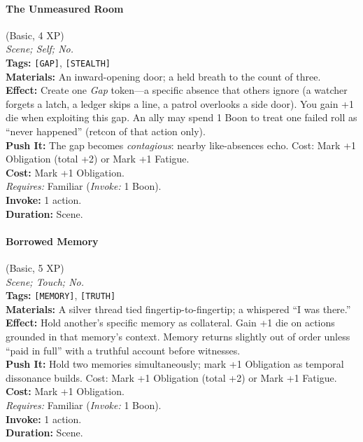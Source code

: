 \paragraph{The Unmeasured Room} (Basic, 4 XP) \hfill \\
\emph{Scene; Self; No.} \\
\textbf{Tags:} \texttt{[GAP]}, \texttt{[STEALTH]} \\
\textbf{Materials:} An inward-opening door; a held breath to the count of three. \\
\textbf{Effect:} Create one \emph{Gap} token---a specific absence that others ignore (a watcher forgets a latch, a ledger skips a line, a patrol overlooks a side door). You gain +1 die when exploiting this gap. An ally may spend 1 Boon to treat one failed roll as ``never happened'' (retcon of that action only). \\
\textbf{Push It:} The gap becomes \emph{contagious}: nearby like-absences echo. Cost: Mark +1 Obligation (total +2) or Mark +1 Fatigue. \\
\textbf{Cost:} Mark +1 Obligation. \\
\textit{Requires:} Familiar (\textit{Invoke:} 1 Boon). \\
\textbf{Invoke:} 1 action. \\
\textbf{Duration:} Scene.

\paragraph{Borrowed Memory} (Basic, 5 XP) \hfill \\
\emph{Scene; Touch; No.} \\
\textbf{Tags:} \texttt{[MEMORY]}, \texttt{[TRUTH]} \\
\textbf{Materials:} A silver thread tied fingertip-to-fingertip; a whispered ``I was there.'' \\
\textbf{Effect:} Hold another's specific memory as collateral. Gain +1 die on actions grounded in that memory's context. Memory returns slightly out of order unless ``paid in full'' with a truthful account before witnesses. \\
\textbf{Push It:} Hold two memories simultaneously; mark +1 Obligation as temporal dissonance builds. Cost: Mark +1 Obligation (total +2) or Mark +1 Fatigue. \\
\textbf{Cost:} Mark +1 Obligation. \\
\textit{Requires:} Familiar (\textit{Invoke:} 1 Boon). \\
\textbf{Invoke:} 1 action. \\
\textbf{Duration:} Scene.


